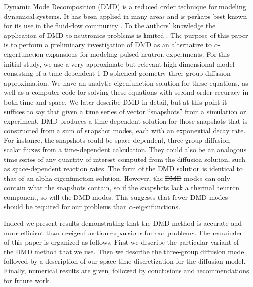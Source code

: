 \documentclass{style/nseJournal}
\providecommand{\DIFadd}[1]{{\protect\color{blue}\uwave{#1}}} %
\providecommand{\DIFdel}[1]{{\protect\color{red}\sout{#1}}}                      %
\providecommand{\DIFaddbegin}{} %
\providecommand{\DIFaddend}{} %
\providecommand{\DIFdelbegin}{} %
\providecommand{\DIFdelend}{} %
\begin{document}
Dynamic Mode Decomposition (DMD) is a reduced order technique for modeling dynamical systems.  
It has been applied in many areas and is perhaps best known for its use in the fluid-flow community 
\cite{kutz2016dynamic} \cite{schmid2010dynamic} \cite{jovanovic2012low}.  
To the authors' knowledge the application of DMD to neutronics problems is limited \cite{abdo2018data} \cite{mcclarren2018calculating}.  
The purpose of this paper is to perform a preliminary investigation of DMD as an alternative to $\alpha$-eigenfunction expansions for modeling pulsed neutron experiments.  
For this initial study, we use a very approximate but relevant high-dimensional model consisting of a time-dependent 1-D spherical geometry three-group diffusion approximation.  
We have an analytic eigenfunction solution for these equations, as well as a computer code for solving these equations with second-order accuracy in both time and space.  
We later describe DMD in detail, but at this point it suffices to say that given a time series of vector ``snapshots'' from a simulation or experiment, DMD produces a time-dependent solution for those snapshots that is constructed from a sum of snapshot modes, each with an exponential decay rate.  
For instance, the snapshots could be space-dependent, three-group diffusion scalar fluxes from a time-dependent calculation.  
They could also be an analogous time series of any quantity of interest computed from the diffusion solution, such as space-dependent reaction rates.  
The form of the DMD solution is identical to that of an alpha-eigenfunction solution.  
However, the \DIFdelbegin \DIFdel{DMD }\DIFdelend \DIFaddbegin \DIFadd{dynamic }\DIFaddend modes can only contain what the snapshots contain, so if 
the snapshots lack a thermal neutron component, so will the \DIFdelbegin \DIFdel{DMD }\DIFdelend \DIFaddbegin \DIFadd{dynamic }\DIFaddend modes.  
This suggests that fewer \DIFdelbegin \DIFdel{DMD }\DIFdelend \DIFaddbegin \DIFadd{dynamic }\DIFaddend modes should be required for our problems than 
$\alpha$-eigenfunctions.  

Indeed we present results demonstrating that the DMD method is accurate and more efficient than $\alpha$-eigenfunction expansions for our problems.  
The remainder of this paper is organized as follows.  
First we describe the particular variant of the DMD method that we use.  
Then we describe the three-group diffusion model, followed by a description of our space-time discretization for the diffusion model.  
Finally, numerical results are given, followed by conclusions and recommendations for future work.  
\end{document}
